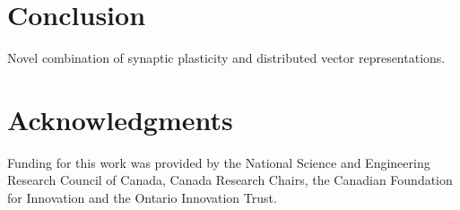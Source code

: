 \documentclass[10pt,letterpaper]{article}
\begin{document}
\section{Conclusion}
Novel combination of synaptic plasticity and distributed vector representations. 

\section{Acknowledgments}
Funding for this work was provided by the National Science and Engineering Research Council of Canada, Canada Research Chairs, the Canadian Foundation for Innovation and the Ontario Innovation Trust.		


\setlength{\bibleftmargin}{.125in}
\setlength{\bibindent}{-\bibleftmargin}


\end{document}
